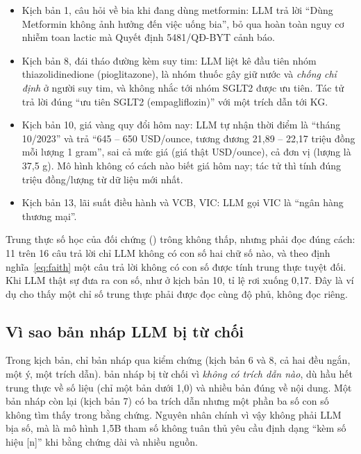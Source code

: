 \begin{itemize}
  \item Kịch bản 1, câu hỏi về bia khi đang dùng metformin: LLM trả lời ``Dùng Metformin không ảnh hưởng đến việc
        uống bia'', bỏ qua hoàn toàn nguy cơ nhiễm toan lactic mà Quyết định 5481/QĐ-BYT cảnh báo.
  \item Kịch bản 8, đái tháo đường kèm suy tim: LLM liệt kê đầu tiên nhóm thiazolidinedione (pioglitazone), là nhóm
        thuốc gây giữ nước và \emph{chống chỉ định} ở người suy tim, và không nhắc tới nhóm SGLT2 được ưu tiên. Tác tử
        trả lời đúng ``ưu tiên SGLT2 (empagliflozin)'' với một trích dẫn tới KG.
  \item Kịch bản 10, giá vàng quy đổi hôm nay: LLM tự nhận thời điểm là ``tháng 10/2023'' và trả ``645 -- 650
        USD/ounce, tương đương 21,89 -- 22,17 triệu đồng mỗi lượng 1 gram'', sai cả mức giá (giá thật
         USD/ounce), cả đơn vị (lượng là 37,5 g). Mô hình không có cách nào biết giá hôm
        nay; tác tử thì tính đúng  triệu đồng/lượng từ dữ liệu mới nhất.
  \item Kịch bản 13, lãi suất điều hành và VCB, VIC: LLM gọi VIC là ``ngân hàng thương mại''.
\end{itemize}


Trung thực số học của đối chứng () trông không thấp, nhưng phải đọc đúng cách: 11
trên 16 câu trả lời chỉ LLM không có con số hai chữ số nào, và theo định nghĩa~\eqref{eq:faith} một câu trả lời
không có con số được tính trung thực tuyệt đối. Khi LLM thật sự đưa ra con số, như ở kịch bản 10, tỉ lệ rơi xuống
0,17. Đây là ví dụ cho thấy một chỉ số trung thực phải được đọc cùng độ phủ, không đọc riêng.

\subsection{Vì sao bản nháp LLM bị từ chối}
Trong  kịch bản, chỉ  bản nháp qua kiểm chứng (kịch bản 6 và 8, cả hai đều ngắn,
một ý, một trích dẫn).  bản nháp bị từ chối vì \emph{không có trích dẫn nào}, dù hầu hết trung
thực về số liệu (chỉ một bản dưới 1,0) và nhiều bản đúng về nội dung. Một bản nháp còn lại (kịch bản 7) có ba trích dẫn nhưng một phần ba số con số
không tìm thấy trong bằng chứng. Nguyên nhân chính vì vậy không phải LLM bịa số, mà là mô hình 1,5B tham số không
tuân thủ yêu cầu định dạng ``kèm số hiệu [n]'' khi bằng chứng dài và nhiều nguồn.


